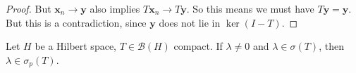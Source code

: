 \documentclass[a4paper]{article}
\begin{document}
\begin{proof}
  But $\mathbf{x}_n \to \mathbf{y}$ also implies $T \mathbf{x}_n \to T \mathbf{y}$. So this means we must have $T\mathbf{y} = \mathbf{y}$. But this is a contradiction, since $\mathbf{y}$ does not lie in $\ker (I - T)$.
%
%
%
%
%
%
\end{proof}

\begin{prop}
  Let $H$ be a Hilbert space, $T \in \mathcal{B}(H)$ compact. If $\lambda \not= 0$ and $\lambda \in \sigma(T)$, then $\lambda \in \sigma_p(T)$.
\end{prop}
\end{document}
